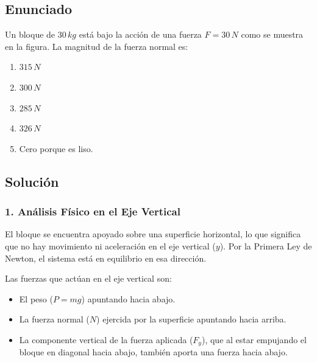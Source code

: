 \documentclass[12pt, a4paper]{article}
\begin{document}
\newpage

\subsection*{Enunciado}
Un bloque de $30 \, \si{kg}$ está bajo la acción de una fuerza $F = 30 \, \si{N}$ como se muestra en la figura. La magnitud de la fuerza normal es:
\begin{enumerate}[label=\alph*)]
    \item $315 \, \si{N}$
    \item $300 \, \si{N}$
    \item $285 \, \si{N}$
    \item $326 \, \si{N}$
    \item Cero porque es liso.
\end{enumerate}

\begin{center}
\end{center}

\subsection*{Solución}

\subsubsection*{1. Análisis Físico en el Eje Vertical}
El bloque se encuentra apoyado sobre una superficie horizontal, lo que significa que no hay movimiento ni aceleración en el eje vertical ($y$). Por la Primera Ley de Newton, el sistema está en equilibrio en esa dirección.

Las fuerzas que actúan en el eje vertical son:
\begin{itemize}
    \item El peso ($P = mg$) apuntando hacia abajo.
    \item La fuerza normal ($N$) ejercida por la superficie apuntando hacia arriba.
    \item La componente vertical de la fuerza aplicada ($F_y$), que al estar empujando el bloque en diagonal hacia abajo, también aporta una fuerza hacia abajo.
\end{itemize}
\end{document}
